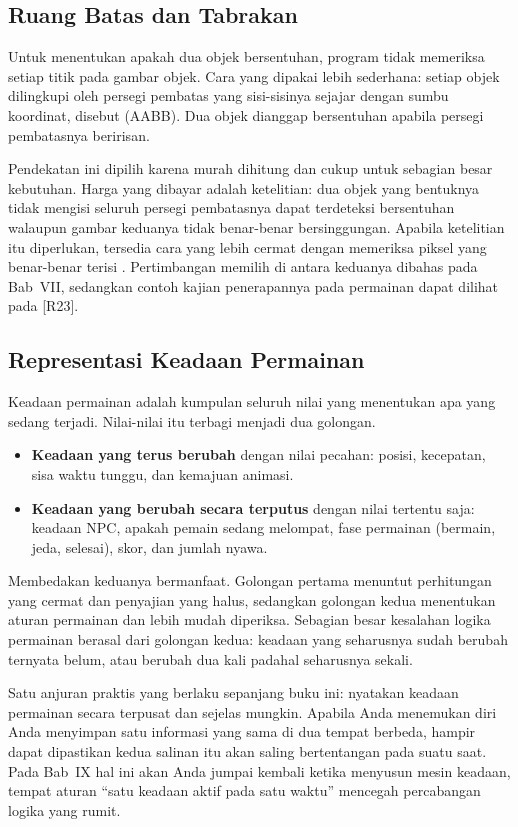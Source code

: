 \subsection{Ruang Batas dan Tabrakan}

Untuk menentukan apakah dua objek bersentuhan, program tidak memeriksa setiap
titik pada gambar objek. Cara yang dipakai lebih sederhana: setiap objek
dilingkupi oleh persegi pembatas yang sisi-sisinya sejajar dengan sumbu
koordinat, disebut  (AABB). Dua objek
dianggap bersentuhan apabila persegi pembatasnya beririsan.

Pendekatan ini dipilih karena murah dihitung dan cukup untuk sebagian besar
kebutuhan. Harga yang dibayar adalah ketelitian: dua objek yang bentuknya
tidak mengisi seluruh persegi pembatasnya dapat terdeteksi bersentuhan
walaupun gambar keduanya tidak benar-benar bersinggungan. Apabila ketelitian
itu diperlukan, tersedia cara yang lebih cermat dengan memeriksa piksel yang
benar-benar terisi \cite{pygame-sprite-mask}. Pertimbangan memilih di antara
keduanya dibahas pada Bab~VII, sedangkan contoh kajian penerapannya pada
permainan dapat dilihat pada \mbox{[R23]}.

\subsection{Representasi Keadaan Permainan}

Keadaan permainan adalah kumpulan seluruh nilai yang menentukan apa yang
sedang terjadi. Nilai-nilai itu terbagi menjadi dua golongan.

\begin{itemize}
  \item \textbf{Keadaan yang terus berubah} dengan nilai pecahan: posisi,
        kecepatan, sisa waktu tunggu, dan kemajuan animasi.
  \item \textbf{Keadaan yang berubah secara terputus} dengan nilai tertentu
        saja: keadaan NPC, apakah pemain sedang melompat, fase permainan
        (bermain, jeda, selesai), skor, dan jumlah nyawa.
\end{itemize}

Membedakan keduanya bermanfaat. Golongan pertama menuntut perhitungan yang
cermat dan penyajian yang halus, sedangkan golongan kedua menentukan aturan
permainan dan lebih mudah diperiksa. Sebagian besar kesalahan logika
permainan berasal dari golongan kedua: keadaan yang seharusnya sudah berubah
ternyata belum, atau berubah dua kali padahal seharusnya sekali.

Satu anjuran praktis yang berlaku sepanjang buku ini: nyatakan keadaan
permainan secara terpusat dan sejelas mungkin. Apabila Anda menemukan diri
Anda menyimpan satu informasi yang sama di dua tempat berbeda, hampir dapat
dipastikan kedua salinan itu akan saling bertentangan pada suatu saat. Pada
Bab~IX hal ini akan Anda jumpai kembali ketika menyusun mesin keadaan, tempat
aturan ``satu keadaan aktif pada satu waktu'' mencegah percabangan logika yang
rumit.
